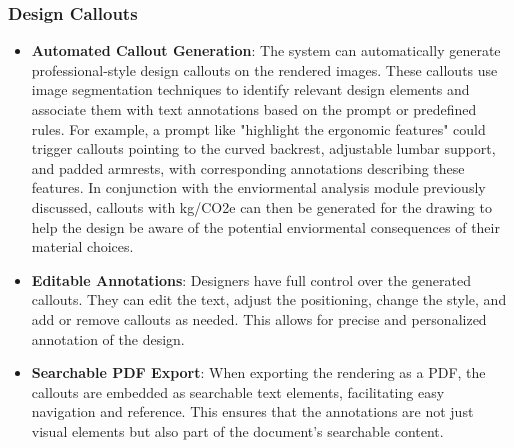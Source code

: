 \documentclass{article}
\begin{document}
\subsubsection{Design Callouts}
\begin{itemize}
\item \textbf{Automated Callout Generation}: The system can automatically generate professional-style design callouts on the rendered images. These callouts use image segmentation techniques to identify relevant design elements and associate them with text annotations based on the prompt or predefined rules. For example, a prompt like "highlight the ergonomic features" could trigger callouts pointing to the curved backrest, adjustable lumbar support, and padded armrests, with corresponding annotations describing these features. In conjunction with the enviormental analysis module previously discussed, callouts with kg/CO2e can then be generated for the drawing to help the design be aware of the potential enviormental consequences of their material choices.
\item \textbf{Editable Annotations}: Designers have full control over the generated callouts. They can edit the text, adjust the positioning, change the style, and add or remove callouts as needed. This allows for precise and personalized annotation of the design.
\item \textbf{Searchable PDF Export}: When exporting the rendering as a PDF, the callouts are embedded as searchable text elements, facilitating easy navigation and reference. This ensures that the annotations are not just visual elements but also part of the document's searchable content.
\end{itemize}
\end{document}
